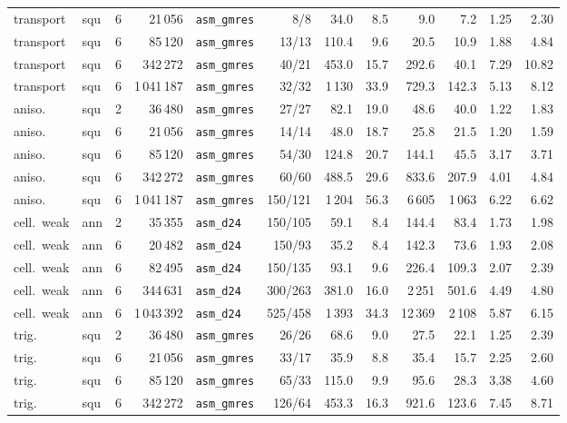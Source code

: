 \begin{tabular}{llrrlrrrrrrr}
transport & squ & 6 & 21\,056 & \texttt{asm\_gmres} & 8/8 & 34.0 & 8.5 & 9.0 & 7.2 & 1.25 & 2.30\\
transport & squ & 6 & 85\,120 & \texttt{asm\_gmres} & 13/13 & 110.4 & 9.6 & 20.5 & 10.9 & 1.88 & 4.84\\
transport & squ & 6 & 342\,272 & \texttt{asm\_gmres} & 40/21 & 453.0 & 15.7 & 292.6 & 40.1 & 7.29 & 10.82\\
transport & squ & 6 & 1\,041\,187 & \texttt{asm\_gmres} & 32/32 & 1\,130 & 33.9 & 729.3 & 142.3 & 5.13 & 8.12\\
aniso. & squ & 2 & 36\,480 & \texttt{asm\_gmres} & 27/27 & 82.1 & 19.0 & 48.6 & 40.0 & 1.22 & 1.83\\
aniso. & squ & 6 & 21\,056 & \texttt{asm\_gmres} & 14/14 & 48.0 & 18.7 & 25.8 & 21.5 & 1.20 & 1.59\\
aniso. & squ & 6 & 85\,120 & \texttt{asm\_gmres} & 54/30 & 124.8 & 20.7 & 144.1 & 45.5 & 3.17 & 3.71\\
aniso. & squ & 6 & 342\,272 & \texttt{asm\_gmres} & 60/60 & 488.5 & 29.6 & 833.6 & 207.9 & 4.01 & 4.84\\
aniso. & squ & 6 & 1\,041\,187 & \texttt{asm\_gmres} & 150/121 & 1\,204 & 56.3 & 6\,605 & 1\,063 & 6.22 & 6.62\\
cell.\ weak & ann & 2 & 35\,355 & \texttt{asm\_d24} & 150/105 & 59.1 & 8.4 & 144.4 & 83.4 & 1.73 & 1.98\\
cell.\ weak & ann & 6 & 20\,482 & \texttt{asm\_d24} & 150/93 & 35.2 & 8.4 & 142.3 & 73.6 & 1.93 & 2.08\\
cell.\ weak & ann & 6 & 82\,495 & \texttt{asm\_d24} & 150/135 & 93.1 & 9.6 & 226.4 & 109.3 & 2.07 & 2.39\\
cell.\ weak & ann & 6 & 344\,631 & \texttt{asm\_d24} & 300/263 & 381.0 & 16.0 & 2\,251 & 501.6 & 4.49 & 4.80\\
cell.\ weak & ann & 6 & 1\,043\,392 & \texttt{asm\_d24} & 525/458 & 1\,393 & 34.3 & 12\,369 & 2\,108 & 5.87 & 6.15\\
trig. & squ & 2 & 36\,480 & \texttt{asm\_gmres} & 26/26 & 68.6 & 9.0 & 27.5 & 22.1 & 1.25 & 2.39\\
trig. & squ & 6 & 21\,056 & \texttt{asm\_gmres} & 33/17 & 35.9 & 8.8 & 35.4 & 15.7 & 2.25 & 2.60\\
trig. & squ & 6 & 85\,120 & \texttt{asm\_gmres} & 65/33 & 115.0 & 9.9 & 95.6 & 28.3 & 3.38 & 4.60\\
trig. & squ & 6 & 342\,272 & \texttt{asm\_gmres} & 126/64 & 453.3 & 16.3 & 921.6 & 123.6 & 7.45 & 8.71\\

\end{tabular}
